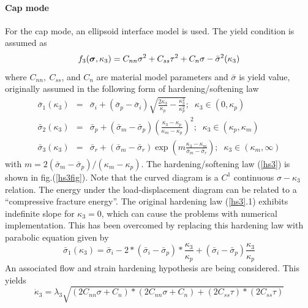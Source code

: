 \documentclass[a4paper]{article}
\newcommand{\mbf}[1]{\mbox{\boldmath$#1$}}
\newcommand{\del}[2]{\mbox{$\displaystyle\frac{#1}{#2}$}}
\newcommand{\sig}{\mbf{\sigma}}
\begin{document}
\paragraph{Cap mode}
For the cap mode, an ellipsoid interface model is used. The yield condition is assumed as
\begin{equation}
  f_3(\sig, \kappa_3) = C_{nn}\sigma^2+C_{ss}\tau^2 + C_n\sigma-\bar\sigma^2(\kappa_3)
\end{equation}
where $C_{nn},\ C_{ss}$, and $C_n$ are material model parameters and $\bar\sigma$ is yield value, originally assumed in the following form of hardening/softening law \cite{Rots}
\begin{eqnarray}
  \nonumber
  \bar\sigma_1(\kappa_3)&=&\bar\sigma_i+(\bar\sigma_p-\bar\sigma_i)\sqrt{\del{2\kappa_3}{\kappa_p}-\del{\kappa_3^2}{\kappa_p^2}};\;\;\kappa_3\in(0,\kappa_p)\\
  \label{hs3}
  \bar\sigma_2(\kappa_3)&=&\bar\sigma_p+(\bar\sigma_m-\bar\sigma_p)\left(\del{\kappa_3-\kappa_p}{\kappa_m-\kappa_p}\right)^2;\;\;\kappa_3\in(\kappa_p, \kappa_m)\\
  \nonumber
  \bar\sigma_3(\kappa_3)&=&\bar\sigma_r+(\bar\sigma_m-\bar\sigma_r)\exp\left(m\del{\kappa_3-\kappa_m}{\bar\sigma_m-\bar\sigma_r}\right);\;\;\kappa_3\in(\kappa_m, \infty)
\end{eqnarray}
with $m=2(\bar\sigma_m-\bar\sigma_p)/(\kappa_m-\kappa_p)$. The hardening/softening law (\ref{hs3}) is shown in fig.(\ref{hs3fig}). Note that the curved diagram is a $C^1$ continuous $\sigma-\kappa_3$ relation. The energy under the load-displacement diagram can be related to a ``compressive fracture energy''.
The original hardening law (\ref{hs3}.1) exhibits indefinite slope for $\kappa_3=0$, which can cause the problems with numerical implementation. This has been overcomed by replacing this hardening law with parabolic equation given by
\begin{equation}
  \bar\sigma_1(\kappa_3) = \bar\sigma_i-2*(\bar\sigma_i-\bar\sigma_p)*\del{\kappa_3}{\kappa_p}+(\bar\sigma_i-\bar\sigma_p)\del{\kappa_3}{\kappa_p}
\end{equation}
An associated flow and strain hardening hypothesis are being considered. This yields
\begin{equation}
  \dot\kappa_3=\lambda_3\sqrt{(2C_{nn}\sigma+C_n)*(2C_{nn}\sigma+C_n) + (2C_{ss}\tau)*(2C_{ss}\tau)}
\end{equation}
\end{document}
